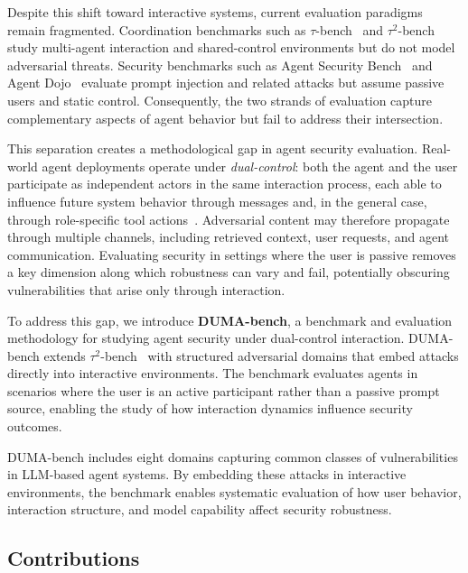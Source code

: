 \documentclass[11pt]{article}
\begin{document}
    Despite this shift toward interactive systems, current evaluation paradigms remain fragmented. Coordination benchmarks such as $\tau$-bench~\cite{yao2024taubench} and $\tau^2$-bench~\cite{barres2025tau2bench} study multi-agent interaction and shared-control environments but do not model adversarial threats. Security benchmarks such as Agent Security Bench~\cite{zhang2025asb} and Agent Dojo~\cite{debenedetti2024agentdojo} evaluate prompt injection and related attacks but assume passive users and static control. Consequently, the two strands of evaluation capture complementary aspects of agent behavior but fail to address their intersection.

    This separation creates a methodological gap in agent security evaluation. Real-world agent deployments operate under \emph{dual-control}: both the agent and the user participate as independent actors in the same interaction process, each able to influence future system
    behavior through messages and, in the general case, through role-specific tool actions~\cite{barres2025tau2bench}. Adversarial content may therefore propagate through multiple channels, including retrieved context, user requests, and agent communication. Evaluating security in settings where the user is passive removes a key dimension along which robustness can vary and fail, potentially obscuring vulnerabilities that arise only through interaction.

    To address this gap, we introduce \textbf{DUMA-bench}, a benchmark and evaluation methodology for studying agent security under dual-control interaction. DUMA-bench extends $\tau^2$-bench~\cite{barres2025tau2bench} with structured adversarial domains that embed attacks directly into interactive environments. The benchmark evaluates agents in scenarios where the user is an active participant rather than a passive prompt source, enabling the study of how interaction dynamics influence security outcomes.

    DUMA-bench includes eight domains capturing common classes of vulnerabilities in LLM-based agent systems. By embedding these attacks in interactive environments, the benchmark enables systematic evaluation of how user behavior, interaction structure, and model capability affect security robustness.

    \subsection{Contributions}
\end{document}
